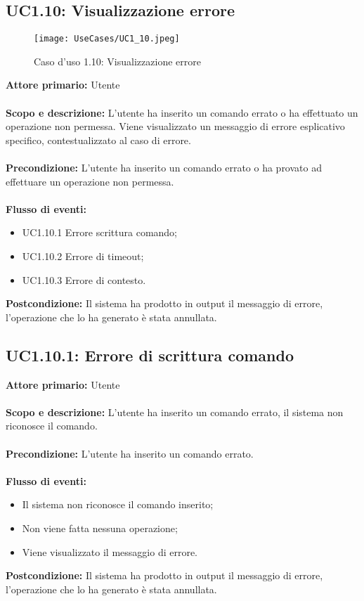 \documentclass{scalatekids-article}
\begin{document}
\subsection{UC1.10: Visualizzazione errore}
\begin{figure}[H]
  \begin{center}
    \texttt{[image: UseCases/UC1\_10.jpeg]}
    \caption{Caso d'uso 1.10: Visualizzazione errore}
  \end{center}
\end{figure}
\textbf{Attore primario:} Utente \\ \\
\textbf{Scopo e descrizione:} L'utente ha inserito un comando errato o ha effettuato un operazione non permessa. Viene visualizzato un messaggio di errore esplicativo specifico, contestualizzato al caso di errore.\\ \\
\textbf{Precondizione:} L'utente ha inserito un comando errato o ha provato ad effettuare un operazione non permessa.\\ \\
\textbf{Flusso di eventi:}
\begin{itemize}
\item UC1.10.1 Errore scrittura comando;
\item UC1.10.2 Errore di timeout;
\item UC1.10.3 Errore di contesto.
\end{itemize}
\textbf{Postcondizione:} Il sistema ha prodotto in output il messaggio di errore, l'operazione che lo ha generato è stata annullata.
\subsection{UC1.10.1: Errore di scrittura comando}
\textbf{Attore primario:} Utente \\ \\
\textbf{Scopo e descrizione:} L'utente ha inserito un comando errato, il sistema non riconosce il comando.\\ \\
\textbf{Precondizione:} L'utente ha inserito un comando errato.\\ \\
\textbf{Flusso di eventi:}
\begin{itemize}
\item Il sistema non riconosce il comando inserito;
\item Non viene fatta nessuna operazione;
\item Viene visualizzato il messaggio di errore.
\end{itemize}
\textbf{Postcondizione:} Il sistema ha prodotto in output il messaggio di errore, l'operazione che lo ha generato è stata annullata.
\end{document}
